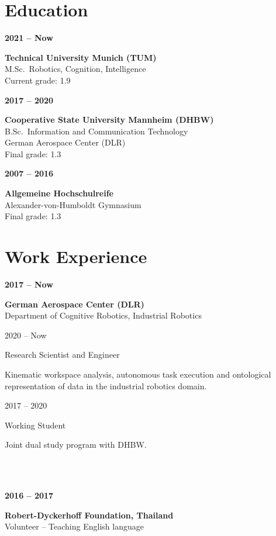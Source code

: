\documentclass[a4paper, 10pt]{article}
\newcommand{\CVEntry}[3]{
    \begin{minipage}[t]{0.23\textwidth}
        \textbf{#1}
    \end{minipage}%
    \begin{minipage}[t]{0.76\textwidth}
        \textbf{#2}\\
        #3
    \end{minipage}%
}
\newcommand{\CVSubEntry}[2]{
    \begin{minipage}[t]{0.23\textwidth}
        \vspace{3pt}
        \hspace{8pt}#1
    \end{minipage}%
    \begin{minipage}[t]{0.76\textwidth}
        \vspace{3pt}
        #2
    \end{minipage}%
}
\begin{document}
\begin{tcbraster}[raster columns=7]
\begin{tcolorbox}[left=1cm, height=1.0\textheight, colback=white, raster multicolumn=5, boxrule=0pt, frame empty, nobeforeafter]
    \section*{Education}
    \CVEntry{2021 -- Now}{Technical University Munich (TUM)}{
        M.Sc.\ Robotics, Cognition, Intelligence\\
        Current grade: 1.9\\
    }
    \CVEntry{2017 -- 2020}{Cooperative State University Mannheim (DHBW)}{
        B.Sc.\ Information and Communication Technology\\
        German Aerospace Center (DLR)\\
        Final grade: 1.3\\
    }
    \CVEntry{2007 -- 2016}{Allgemeine Hochschulreife}{
        Alexander-von-Humboldt Gymnasium\\
        Final grade: 1.3\\
    }
    \vspace{5mm}
    \section*{Work Experience}
    \CVEntry{2017 -- Now}{German Aerospace Center (DLR)}{
        Department of Cognitive Robotics, Industrial Robotics
    }%
    \CVSubEntry{2020 -- Now}{
        Research Scientist and Engineer
        {
            \small\begin{spacing}{0.9}
            Kinematic workspace analysis, autonomous task execution and ontological representation of data in the industrial robotics domain.
            \end{spacing}%
            \vspace{2pt}
        }%
    }%
    \CVSubEntry{2017 -- 2020}{
        Working Student
        {
            \small\begin{spacing}{0.9}
            Joint dual study program with DHBW.
            \end{spacing}%
            \vspace{2pt}
        }
    }\\\\
    \CVEntry{2016 -- 2017}{Robert-Dyckerhoff Foundation, Thailand}{
        Volunteer -- Teaching English language\\
    }
    \vspace{5mm}
    \printbibliography[title=Publications]

    \vspace{5mm}

\end{tcolorbox}
\end{tcbraster}
\end{document}
